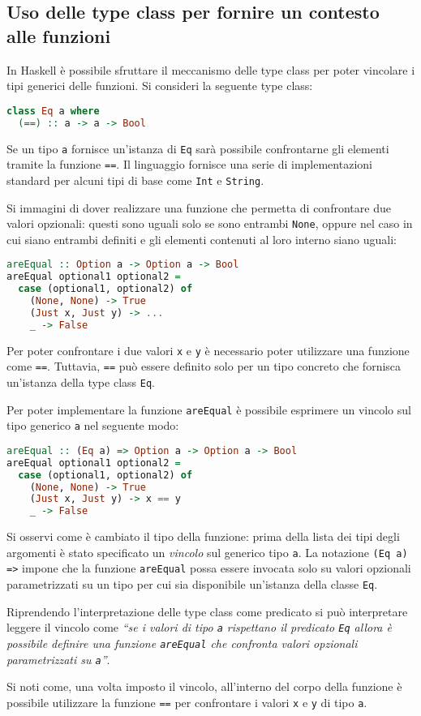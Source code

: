 \subsection{Uso delle type class per fornire un contesto alle funzioni}
In Haskell è possibile sfruttare il meccanismo delle type class per poter vincolare i tipi generici delle funzioni.
Si consideri la seguente type class:
\begin{lstlisting}[language=haskell]
class Eq a where
  (==) :: a -> a -> Bool
\end{lstlisting}
Se un tipo \lstinline{a} fornisce un'istanza di \lstinline{Eq} sarà possibile confrontarne gli elementi tramite la funzione \lstinline{==}. Il linguaggio fornisce una serie di implementazioni standard per alcuni tipi di base come \lstinline{Int} e \lstinline{String}.

Si immagini di dover realizzare una funzione che permetta di confrontare due valori opzionali: questi sono uguali solo se sono entrambi \lstinline{None}, oppure nel caso in cui siano entrambi definiti e gli elementi contenuti al loro interno siano uguali:
\begin{lstlisting}[language=haskell]
areEqual :: Option a -> Option a -> Bool
areEqual optional1 optional2 =
  case (optional1, optional2) of
    (None, None) -> True
    (Just x, Just y) -> ...
    _ -> False
\end{lstlisting}
Per poter confrontare i due valori \lstinline{x} e \lstinline{y} è necessario poter utilizzare una funzione come \lstinline{==}. Tuttavia, \lstinline{==} può essere definito solo per un tipo concreto che fornisca un'istanza della type class \lstinline{Eq}.

Per poter implementare la funzione \lstinline{areEqual} è possibile esprimere un vincolo sul tipo generico \lstinline{a} nel seguente modo:
\begin{lstlisting}[language=haskell]
areEqual :: (Eq a) => Option a -> Option a -> Bool
areEqual optional1 optional2 =
  case (optional1, optional2) of
    (None, None) -> True
    (Just x, Just y) -> x == y
    _ -> False
\end{lstlisting}
Si osservi come è cambiato il tipo della funzione: prima della lista dei tipi degli argomenti è stato specificato un \emph{vincolo} sul generico tipo \lstinline{a}. La notazione \lstinline{(Eq a) =>} impone che la funzione \lstinline{areEqual} possa essere invocata solo su valori opzionali parametrizzati su un tipo per cui sia disponibile un'istanza della classe \lstinline{Eq}.

Riprendendo l'interpretazione delle type class come predicato si può interpretare leggere il vincolo come \emph{``se i valori di tipo \lstinline{a} rispettano il predicato \lstinline{Eq} allora è possibile definire una funzione \lstinline{areEqual} che confronta valori opzionali parametrizzati su \lstinline{a}''}.

Si noti come, una volta imposto il vincolo, all'interno del corpo della funzione è possibile utilizzare la funzione \lstinline{==} per confrontare i valori \lstinline{x} e \lstinline{y} di tipo \lstinline{a}.

